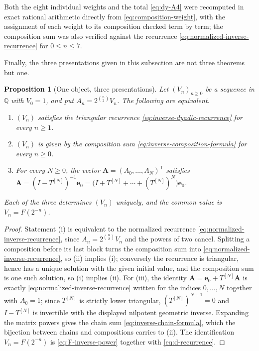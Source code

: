 \documentclass[11pt,oneside]{article}
\newtheorem{proposition}[theorem]{Proposition}
\theoremstyle{definition}
\theoremstyle{remark}
\newcommand{\Q}{\mathbb Q}
\begin{document}
Both the eight individual weights and the total \eqref{eq:dy-A4} were recomputed in exact
rational arithmetic directly from \eqref{eq:composition-weight}, with the assignment of each
weight to its composition checked term by term; the composition sum was also verified against
the recurrence \eqref{eq:normalized-inverse-recurrence} for $0\le n\le7$.

Finally, the three presentations given in this subsection are not three theorems but one.

\begin{proposition}[One object, three presentations]
\label{prop:dy-three-presentations}
Let $(V_n)_{n\ge0}$ be a sequence in $\Q$ with $V_0=1$, and put $A_n=2^{\binom n2}V_n$.  The
following are equivalent.
\begin{enumerate}[label=\textup{(\roman*)}]
\item $(V_n)$ satisfies the triangular recurrence \eqref{eq:inverse-dyadic-recurrence} for
every $n\ge1$.
\item $(V_n)$ is given by the composition sum \eqref{eq:inverse-composition-formula} for
every $n\ge0$.
\item For every $N\ge0$, the vector $\mathbf A=(A_0,\ldots,A_N)^{\mathsf T}$ satisfies
$\mathbf A=(I-T^{[N]})^{-1}\mathbf e_0
=\bigl(I+T^{[N]}+\cdots+(T^{[N]})^N\bigr)\mathbf e_0$.
\end{enumerate}
Each of the three determines $(V_n)$ uniquely, and the common value is $V_n=F(2^{-n})$.
\end{proposition}

\begin{proof}
Statement (i) is equivalent to the normalized recurrence
\eqref{eq:normalized-inverse-recurrence}, since $A_n=2^{\binom n2}V_n$ and the powers of two
cancel.  Splitting a composition before its last block turns the composition sum into
\eqref{eq:normalized-inverse-recurrence}, so (ii) implies (i); conversely the recurrence is
triangular, hence has a unique solution with the given initial value, and the composition sum
is one such solution, so (i) implies (ii).  For (iii), the identity
$\mathbf A=\mathbf e_0+T^{[N]}\mathbf A$ is exactly
\eqref{eq:normalized-inverse-recurrence} written for the indices $0,\ldots,N$ together with
$A_0=1$; since $T^{[N]}$ is strictly lower triangular, $(T^{[N]})^{N+1}=0$ and $I-T^{[N]}$ is
invertible with the displayed nilpotent geometric inverse.  Expanding the matrix powers gives
the chain sum \eqref{eq:inverse-chain-formula}, which the bijection between chains and
compositions carries to (ii).  The identification $V_n=F(2^{-n})$ is
\eqref{eq:F-inverse-power} together with \eqref{eq:d-recurrence}.
\end{proof}
\end{document}
